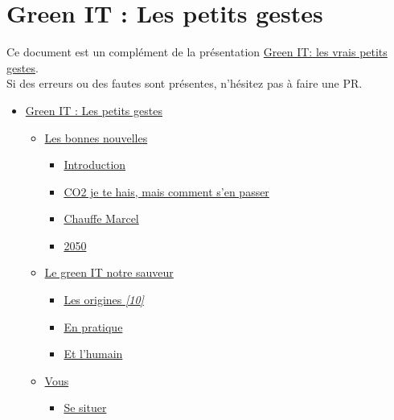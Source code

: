 \hypertarget{green-it-les-petits-gestes}{%
\section{Green IT : Les petits
gestes}\label{green-it-les-petits-gestes}}

Ce document est un complément de la présentation
\href{https://prezi.com/view/qpvCT5y3PdddpkdkU7Z4}{Green IT: les vrais
petits gestes}.\\
Si des erreurs ou des fautes sont présentes, n'hésitez pas à faire une
PR.

\begin{itemize}
\tightlist
\item
  \protect\hyperlink{green-it--les-petits-gestes}{Green IT : Les petits
  gestes}

  \begin{itemize}
  \tightlist
  \item
    \protect\hyperlink{les-bonnes-nouvelles}{Les bonnes nouvelles}

    \begin{itemize}
    \tightlist
    \item
      \protect\hyperlink{introduction}{Introduction}
    \item
      \protect\hyperlink{co2-je-te-hais-mais-comment-sen-passer}{CO2 je
      te hais, mais comment s'en passer}
    \item
      \protect\hyperlink{chauffe-marcel}{Chauffe Marcel}
    \item
      \protect\hyperlink{2050}{2050}
    \end{itemize}
  \item
    \protect\hyperlink{le-green-it-notre-sauveur}{Le green IT notre
    sauveur}

    \begin{itemize}
    \tightlist
    \item
      \protect\hyperlink{les-origines-10}{Les origines \emph{{[}10{]}}}
    \item
      \protect\hyperlink{en-pratique}{En pratique}
    \item
      \protect\hyperlink{et-lhumain}{Et l'humain}
    \end{itemize}
  \item
    \protect\hyperlink{vous}{Vous}

    \begin{itemize}
    \tightlist
    \item
      \protect\hyperlink{se-situer}{Se situer}


\end{itemize}
\end{itemize}
\end{itemize}
